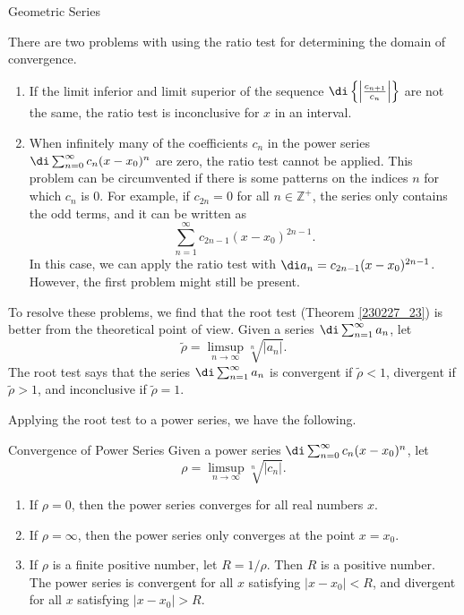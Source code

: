 \begin{example}[label=230305_16]{Geometric Series}
\begin{example}[label=230304_9]{}
There are two problems with using the ratio test for determining the domain of convergence.
\begin{enumerate}[1.]
\item
If the limit inferior and limit superior of the sequence  $\di\left\{\left|\frac{c_{n+1}}{c_n}\right|\right\}$ are not the same, the ratio test is inconclusive for $x$ in an interval. 
\item When infinitely many of the coefficients $c_n$ in  the power series $\di\sum_{n=0}^{\infty}c_n(x-x_0)^n$ are zero, the ratio test cannot be applied. This problem can be circumvented if there is some patterns on the indices $n$ for which $c_n$ is 0. For example, if $c_{2n}=0$ for all $n\in\mathbb{Z}^+$, the series only contains the odd terms, and it can be written as
\[\sum_{n=1}^{\infty}c_{2n-1}(x-x_0)^{2n-1}.\]
In this case, we can apply the ratio test with $\di a_n=c_{2n-1}(x-x_0)^{2n-1}$. However, the first problem might still be present.
\end{enumerate}

To resolve these problems, we find that the root test (Theorem \ref{230227_23}) is better from the theoretical point of view. Given a  series $\di\sum_{n=1}^{\infty}a_n$, let 
\[\widetilde{\rho}=\limsup_{n\to\infty}\sqrt[n]{|a_n|}.\]The root test says that the series  $\di\sum_{n=1}^{\infty}a_n$ is convergent if $\widetilde{\rho}<1$, divergent if $\widetilde{\rho}>1$, and inconclusive if $\widetilde{\rho}=1$.

Applying the root test to a power series, we have the following.


\begin{theorem}[label=230305_5]{Convergence of Power Series}
Given a power series $\di\sum_{n=0}^{\infty}c_n(x-x_0)^n$, let
\[\rho=\limsup_{n\to\infty}\sqrt[n]{|c_n|}.\]
\begin{enumerate}[1.]
\item If $\rho=0$, then the power series converges  for all real numbers $x$.
\item If $\rho=\infty$, then the power series only converges at the point $x=x_0$.
\item If $\rho$ is a finite positive number, let $R=1/\rho$. Then $R$ is a positive number. The power series is convergent for all $x$ satisfying $|x-x_0|<R$, and divergent for all $x$ satisfying $|x-x_0|>R$. 

\end{enumerate}
\end{theorem}


\end{example}
\end{example}

